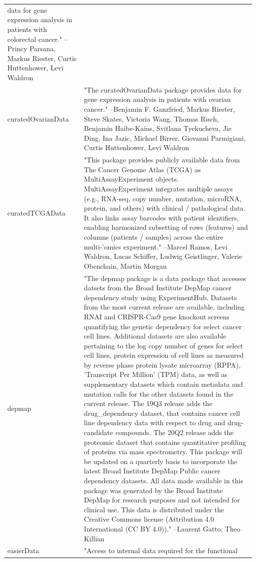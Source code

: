 \documentclass[]{article}
\begin{document}
\begin{longtable}[t]{l>{\raggedright\arraybackslash}p{25em}}
data for gene expression analysis in patients with colorectal
cancer." --Princy Parsana, Markus Riester, Curtis Huttenhower, Levi Waldron\\
curatedOvarianData & "The curatedOvarianData package provides data for gene
expression analysis in patients with ovarian cancer." --Benjamin F. Ganzfried, Markus Riester, Steve Skates, Victoria Wang, Thomas Risch, Benjamin Haibe-Kains, Svitlana Tyekucheva, Jie Ding, Ina Jazic, Michael Birrer, Giovanni Parmigiani, Curtis Huttenhower, Levi Waldron\\
curatedTCGAData & "This package provides publicly available data from The
Cancer Genome Atlas (TCGA) as MultiAssayExperiment objects.
MultiAssayExperiment integrates multiple assays (e.g., RNA-seq,
copy number, mutation, microRNA, protein, and others) with
clinical / pathological data. It also links assay barcodes with
patient identifiers, enabling harmonized subsetting of rows
(features) and columns (patients / samples) across the entire
multi-'omics experiment." --Marcel Ramos, Levi Waldron, Lucas Schiffer, Ludwig Geistlinger, Valerie Obenchain, Martin Morgan\\
depmap & "The depmap package is a data package that accesses datsets
from the Broad Institute DepMap cancer dependency study using
ExperimentHub. Datasets from the most current release are
available, including RNAI and CRISPR-Cas9 gene knockout screens
quantifying the genetic dependency for select cancer cell
lines. Additional datasets are also available pertaining to the
log copy number of genes for select cell lines, protein
expression of cell lines as measured by reverse phase protein
lysate microarray (RPPA), 'Transcript Per Million' (TPM) data,
as well as supplementary datasets which contain metadata and
mutation calls for the other datasets found in the current
release. The 19Q3 release adds the drug\_dependency dataset,
that contains cancer cell line dependency data with respect to
drug and drug-candidate compounds. The 20Q2 release adds the
proteomic dataset that contains quantitative profiling of
proteins via mass spectrometry. This package will be updated on
a quarterly basis to incorporate the latest Broad Institute
DepMap Public cancer dependency datasets. All data made
available in this package was generated by the Broad Institute
DepMap for research purposes and not intended for clinical use.
This data is distributed under the Creative Commons license
(Attribution 4.0 International (CC BY 4.0))." --Laurent Gatto, Theo Killian\\
\addlinespace
easierData & "Access to internal data required for the functional

\end{longtable}
\end{document}
